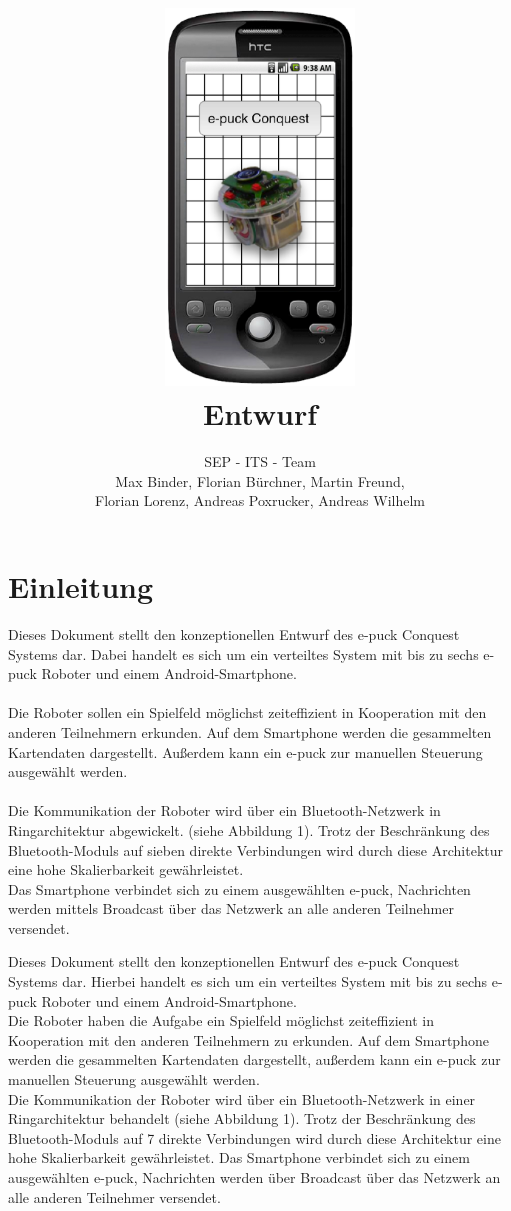 \documentclass[10pt,a4paper]{article}
\title{
	\includegraphics[height=10cm]{logo.eps} \\
	\vspace{1cm}
	Entwurf
}
\author{SEP - ITS - Team \\ Max Binder, Florian Bürchner, Martin Freund, \\Florian Lorenz,
											Andreas Poxrucker, Andreas Wilhelm}
\let\oldsection\section
\renewcommand{\section}{\newpage \oldsection}
\begin{document}
	\maketitle
	\newpage
	\tableofcontents	
	\newpage

	\section{Einleitung}
		Dieses Dokument stellt den konzeptionellen Entwurf des e-puck Conquest Systems dar. Dabei handelt es sich um ein
		verteiltes System mit bis zu sechs e-puck Roboter und einem Android-Smartphone. \\ \\
		Die Roboter sollen ein Spielfeld möglichst zeiteffizient in Kooperation mit den anderen Teilnehmern erkunden.
		Auf dem Smartphone werden die gesammelten Kartendaten dargestellt. Außerdem kann ein e-puck zur manuellen Steuerung
		ausgewählt werden. \\ \\
		Die Kommunikation der Roboter wird über ein Bluetooth-Netzwerk in Ringarchitektur abgewickelt. (siehe Abbildung 1). Trotz
		der Beschränkung des Bluetooth-Moduls auf sieben direkte Verbindungen wird durch diese Architektur eine hohe Skalierbarkeit
		gewährleistet. \\
		Das Smartphone verbindet sich zu einem ausgewählten e-puck, Nachrichten werden mittels Broadcast über das Netzwerk an alle 
		anderen Teilnehmer versendet.
		
		Dieses Dokument stellt den konzeptionellen Entwurf des e-puck Conquest Systems dar. Hierbei handelt es sich um ein
		verteiltes System mit bis zu sechs  e-puck Roboter und einem Android-Smartphone. \\
		Die Roboter haben die Aufgabe ein Spielfeld möglichst zeiteffizient in Kooperation mit den anderen Teilnehmern zu erkunden.
		Auf dem Smartphone werden die gesammelten Kartendaten dargestellt, außerdem kann ein e-puck zur manuellen Steuerung
		ausgewählt werden. \\
		Die Kommunikation der Roboter wird über ein Bluetooth-Netzwerk in einer Ringarchitektur behandelt (siehe Abbildung 1). Trotz
		der Beschränkung des Bluetooth-Moduls auf 7 direkte Verbindungen wird durch diese Architektur eine hohe Skalierbarkeit
		gewährleistet. Das Smartphone verbindet sich zu einem ausgewählten e-puck, Nachrichten werden über Broadcast über
		das Netzwerk an alle anderen Teilnehmer versendet.
\end{document}
